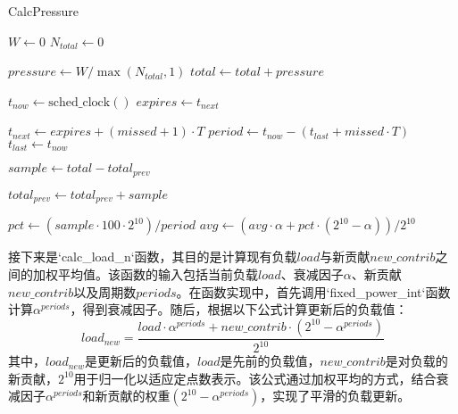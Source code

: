 \begin{algorithm}[h]
    \caption{CalcPressure}
    \label{alg:calc_pressure}

    $W \gets 0$\;
    $N_{total} \gets 0$\;


    $pressure \gets W / \max(N_{total}, 1)$\;
    $total \gets total + pressure$\;

    $t_{now} \gets \mathrm{sched\_clock}()$\;  
    $expires \gets t_{next}$\;



    $t_{next} \gets expires + (missed + 1) \cdot T$\;
    $period \gets t_{now} - (t_{last} + missed \cdot T)$\;
    $t_{last} \gets t_{now}$\;

    $sample \gets total - total_{prev}$\;

    $total_{prev} \gets total_{prev} + sample$\;


    $pct \gets (sample \cdot 100 \cdot 2^{10}) / period$\;
    $avg \gets (avg \cdot \alpha + pct \cdot (2^{10} - \alpha)) / 2^{10}$\;
\end{algorithm}
接下来是`calc\_load\_n`函数，其目的是计算现有负载$load$与新贡献$new\_contrib$之间的加权平均值。该函数的输入包括当前负载$load$、衰减因子$\alpha$、新贡献$new\_contrib$以及周期数$periods$。在函数实现中，首先调用`fixed\_power\_int`函数计算$\alpha^{periods}$，得到衰减因子。随后，根据以下公式计算更新后的负载值：
\[
load_{new} = \frac{load \cdot \alpha^{periods} + new\_contrib \cdot (2^{10} - \alpha^{periods})}{2^{10}}
\]
其中，$load_{new}$是更新后的负载值，$load$是先前的负载值，$new\_contrib$是对负载的新贡献，$2^{10}$用于归一化以适应定点数表示。该公式通过加权平均的方式，结合衰减因子$\alpha^{periods}$和新贡献的权重$(2^{10} - \alpha^{periods})$，实现了平滑的负载更新。

